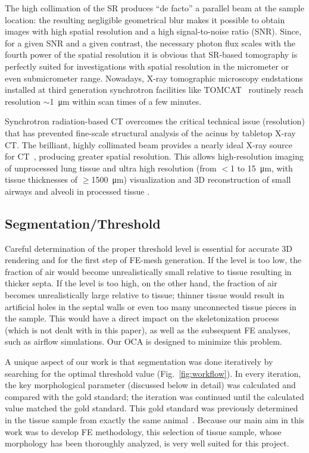 The high collimation of the SR produces ``de facto'' a parallel beam at the sample location: the resulting negligible geometrical blur makes it possible to obtain images with high spatial resolution and a high signal-to-noise ratio (SNR). Since, for a given SNR and a given contrast, the necessary photon flux scales with the fourth power of the spatial resolution \cite{Bonse1996} it is obvious that SR-based tomography is perfectly suited for investigations with spatial resolution in the micrometer or even submicrometer range. Nowadays, X-ray tomographic microscopy endstations installed at third generation synchrotron facilities like TOMCAT~\cite{Stampanoni2007} routinely reach resolution $\sim$\SI{1}{\micro\meter} within scan times of a few minutes.

Synchrotron radiation-based CT overcomes the critical technical issue (resolution) that has prevented fine-scale structural analysis of the acinus by tabletop X-ray \micro CT. The brilliant, highly collimated beam provides a nearly ideal X-ray source for \micro CT~\cite{Jorgensen1998}, producing greater spatial resolution. This allows high-resolution imaging of unprocessed lung tissue \cite{Bayat2006,Jheon2006,Monfraix2005,Sera2007,Sera2005} and ultra high resolution (from $<$1 to \SI{15}{\micro\meter}, with tissue thicknesses of $\geq$\SI{1500}{\micro\meter}) visualization and 3D reconstruction of small airways and alveoli in processed tissue \cite{Ikura2004,Schittny2008}.

\subsection{Segmentation/Threshold}
Careful determination of the proper threshold level is essential for accurate 3D rendering and for the first step of FE-mesh generation. If the level is too low, the fraction of air would become unrealistically small relative to tissue resulting in thicker septa. If the level is too high, on the other hand, the fraction of air becomes unrealistically large relative to tissue; thinner tissue would result in artificial holes in the septal walls or even too many unconnected tissue pieces in the sample. This would have a direct impact on the skeletonization process (which is not dealt with in this paper), as well as the subsequent FE analyses, such as airflow simulations. Our OCA is designed to minimize this problem.

A unique aspect of our work is that segmentation was done iteratively by searching for the optimal threshold value (Fig.~\ref{fig:workflow}). In every iteration, the key morphological parameter (discussed below in detail) was calculated and compared with the gold standard; the iteration was continued until the calculated value matched the gold standard. This gold standard was previously determined in the tissue sample from exactly the same animal~\cite{Tschanz2003}. Because our main aim in this work was to develop FE methodology, this selection of tissue sample, whose morphology has been thoroughly analyzed, is very well suited for this project.

